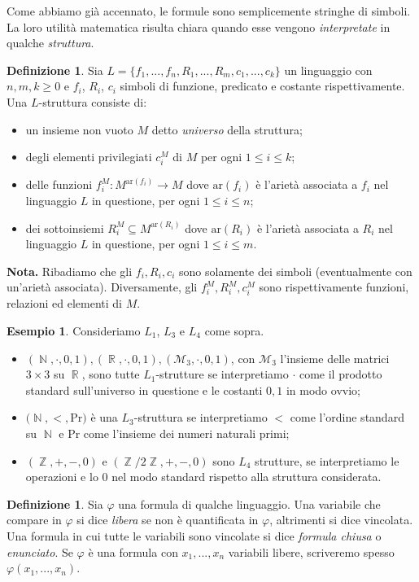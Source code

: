 \documentclass[12pt,a4paper]{report}
\theoremstyle{definition}
\newtheorem{defn}[teo]{Definizione}  %
\newtheorem{es}[teo]{Esempio}  %
\theoremstyle{num.custom-title}
\DeclareMathOperator{\N}{\mathbb{N}}
\DeclareMathOperator{\R}{\mathbb{R}}
\DeclareMathOperator{\Z}{\mathbb{Z}}
\DeclareMathOperator{\sse}{\subseteq}
\renewcommand{\phi}{\varphi}
\begin{document}
Come abbiamo già accennato, le formule sono semplicemente stringhe di simboli. La loro utilità matematica risulta chiara quando esse vengono \emph{interpretate} in qualche \emph{struttura}.

\begin{defn}
Sia $L=\{f_1,...,f_n,R_1,...,R_m, c_1,...,c_k\}$ un linguaggio con $n,m,k \geq 0$ e $f_i$, $R_i$, $c_i$ simboli di funzione, predicato e costante rispettivamente. Una $L$-struttura consiste di:
\begin{itemize}
\item un insieme non vuoto $M$ detto \emph{universo} della struttura;
\item degli elementi privilegiati $c_i^M$ di $M$ per ogni $1 \leq i \leq k$;
\item delle funzioni $f_i^M : M^{\text{ar}(f_i)} \to M$ dove $\text{ar}(f_i)$ è l'arietà associata a $f_i$ nel linguaggio $L$ in questione, per ogni $1 \leq i \leq n$;
\item dei sottoinsiemi $R_i^M \sse M^{\text{ar}(R_i)}$ dove $\text{ar}(R_i)$ è l'arietà associata a $R_i$ nel linguaggio $L$ in questione, per ogni $1 \leq i \leq m$.
\end{itemize}
\textbf{Nota.} Ribadiamo che gli $f_i,R_i,c_i$ sono solamente dei simboli (eventualmente con un'arietà associata). Diversamente, gli $f_i^M,R_i^M,c_i^M$ sono rispettivamente funzioni, relazioni ed elementi di $M$.
\end{defn}

\begin{es} Consideriamo $L_1$, $L_3$ e $L_4$ come sopra.
\begin{itemize}
\item $(\N,\cdot,0,1), (\R,\cdot,0,1), (\mathcal{M}_3,\cdot,0,1)$, con $\mathcal{M}_3$ l'insieme delle matrici $3 \times 3$ su $\R$, sono tutte $L_1$-strutture se interpretiamo $\cdot$ come il prodotto standard sull'universo in questione e le costanti $0,1$ in modo ovvio;
\item $(\N,<,$Pr$)$ è una $L_3$-struttura se interpretiamo $<$ come l'ordine standard su $\N$ e Pr come l'insieme dei numeri naturali primi;
\item $(\Z,+,-,0)$ e $(\Z/2\Z,+,-,0)$ sono $L_4$ strutture, se interpretiamo le operazioni e lo $0$ nel modo standard rispetto alla struttura considerata.
\end{itemize}
\end{es}

\begin{defn}
Sia $\phi$ una formula di qualche linguaggio. Una variabile che compare in $\phi$ si dice \emph{libera} se non è quantificata in $\phi$, altrimenti si dice vincolata. Una formula in cui tutte le variabili sono vincolate si dice \emph{formula chiusa} o \emph{enunciato}. Se $\phi$ è una formula con $x_1,...,x_n$ variabili libere, scriveremo spesso $\phi(x_1,...,x_n)$.
\end{defn}
\end{document}
